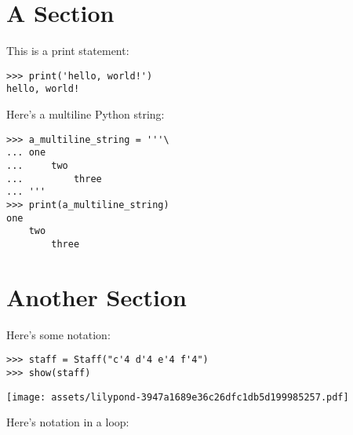 \documentclass{article}
\begin{document}
\section{A Section}

This is a print statement:

\begin{comment}
<abjad>
print('hello, world!')
</abjad>
\end{comment}

\begin{lstlisting}
>>> print('hello, world!')
hello, world!
\end{lstlisting}

Here's a multiline Python string:

\begin{comment}
<abjad>
a_multiline_string = '''\
one
    two
        three
'''
print(a_multiline_string)
</abjad>
\end{comment}

\begin{lstlisting}
>>> a_multiline_string = '''\
... one
...     two
...         three
... '''
>>> print(a_multiline_string)
one
    two
        three
\end{lstlisting}

\section{Another Section}

Here's some notation:

\begin{comment}
<abjad>
staff = Staff("c'4 d'4 e'4 f'4")
show(staff)
</abjad>
\end{comment}

\begin{lstlisting}
>>> staff = Staff("c'4 d'4 e'4 f'4")
>>> show(staff)
\end{lstlisting}
\noindent\texttt{[image: assets/lilypond-3947a1689e36c26dfc1db5d199985257.pdf]}

Here's notation in a loop:

\begin{comment}
<abjad>
for leaf in staff.select_leaves():
    duration = inspect_(leaf).get_duration()
    print(duration)
    show(leaf)

</abjad>
\end{comment}
\end{document}
